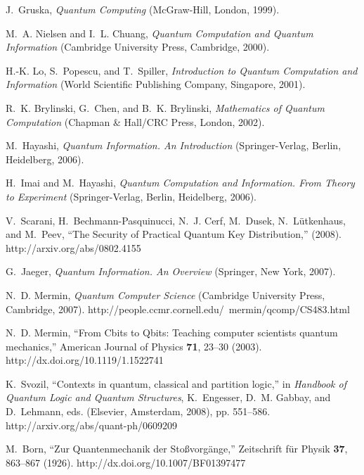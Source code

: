 \documentclass[prl,amsfonts,amsmath,showpacs,showkeys,preprint]{revtex4}
\begin{document}
\begin{thebibliography}{10}
J.~Gruska, {\em Quantum Computing\/} (McGraw-Hill, London, 1999).

M.~A. Nielsen and I.~L. Chuang, {\em Quantum Computation and Quantum
  Information\/} (Cambridge University Press, Cambridge, 2000).

H.-K. Lo, S.~Popescu, and T.~Spiller, {\em Introduction to Quantum Computation
  and Information\/} (World Scientific Publishing Company, Singapore, 2001).

R.~K. Brylinski, G.~Chen, and B.~K. Brylinski, {\em Mathematics of Quantum
  Computation\/} (Chapman \& Hall/CRC Press, London, 2002).

M.~Hayashi, {\em Quantum Information. {A}n Introduction\/} (Springer-Verlag,
  Berlin, Heidelberg, 2006).

H.~Imai and M.~Hayashi, {\em Quantum Computation and Information. {F}rom Theory
  to Experiment\/} (Springer-Verlag, Berlin, Heidelberg, 2006).

V.~Scarani, H.~Bechmann-Pasquinucci, N.~J. Cerf, M.~Dusek, N.~L{\"u}tkenhaus,
  and M.~Peev, \enquote{The Security of Practical Quantum Key Distribution,}
  (2008).
\newline http://arxiv.org/abs/0802.4155

G.~Jaeger, {\em Quantum Information. {A}n Overview\/} (Springer, New York,
  2007).

N.~D. Mermin, {\em Quantum Computer Science\/} (Cambridge University Press,
  Cambridge, 2007).
\newline http://people.ccmr.cornell.edu/~mermin/qcomp/CS483.html

N.~D. Mermin, \enquote{From {C}bits to {Q}bits: Teaching computer scientists
  quantum mechanics,} American Journal of Physics {\bf 71}, 23--30 (2003).
\newline http://dx.doi.org/10.1119/1.1522741

K.~Svozil, \enquote{Contexts in quantum, classical and partition logic,} in
  {\em Handbook of Quantum Logic and Quantum Structures\/}, K.~Engesser, D.~M.
  Gabbay, and D.~Lehmann, eds.  (Elsevier, Amsterdam, 2008), pp. 551--586.
\newline http://arxiv.org/abs/quant-ph/0609209

M.~Born, \enquote{Zur {Q}uantenmechanik der {S}to{\ss}vorg{\"{a}}nge,}
  Zeitschrift f{\"{u}}r Physik {\bf 37}, 863--867 (1926).
\newline http://dx.doi.org/10.1007/BF01397477


\end{thebibliography}
\end{document}
